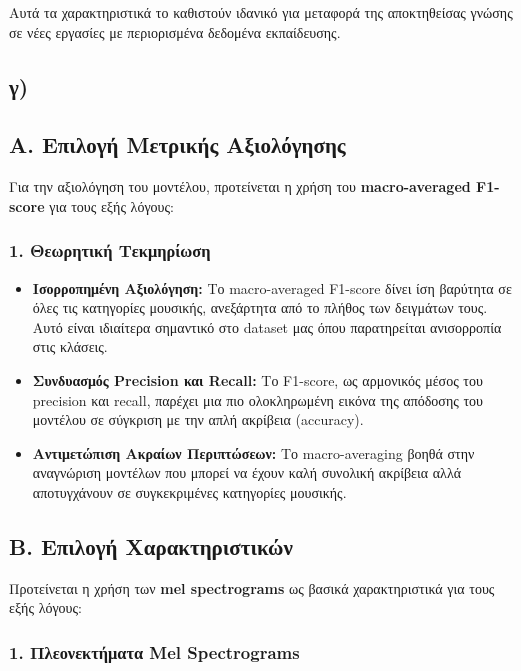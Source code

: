 \documentclass[a4paper,12pt]{article}
\begin{document}
Αυτά τα χαρακτηριστικά το καθιστούν ιδανικό για μεταφορά της αποκτηθείσας γνώσης σε νέες εργασίες με περιορισμένα δεδομένα εκπαίδευσης.


\subsection*{γ)}

\subsection*{Α. Επιλογή Μετρικής Αξιολόγησης}

Για την αξιολόγηση του μοντέλου, προτείνεται η χρήση του \textbf{macro-averaged F1-score} για τους εξής λόγους:

\subsubsection*{1. Θεωρητική Τεκμηρίωση}

\begin{itemize}
    \item \textbf{Ισορροπημένη Αξιολόγηση:} Το macro-averaged F1-score δίνει ίση βαρύτητα σε όλες τις κατηγορίες μουσικής, ανεξάρτητα από το πλήθος των δειγμάτων τους. Αυτό είναι ιδιαίτερα σημαντικό στο dataset μας όπου παρατηρείται ανισορροπία στις κλάσεις.

    \item \textbf{Συνδυασμός Precision και Recall:} Το F1-score, ως αρμονικός μέσος του precision και recall, παρέχει μια πιο ολοκληρωμένη εικόνα της απόδοσης του μοντέλου σε σύγκριση με την απλή ακρίβεια (accuracy).

    \item \textbf{Αντιμετώπιση Ακραίων Περιπτώσεων:} Το macro-averaging βοηθά στην αναγνώριση μοντέλων που μπορεί να έχουν καλή συνολική ακρίβεια αλλά αποτυγχάνουν σε συγκεκριμένες κατηγορίες μουσικής.
\end{itemize}

\subsection*{Β. Επιλογή Χαρακτηριστικών}

Προτείνεται η χρήση των \textbf{mel spectrograms} ως βασικά χαρακτηριστικά για τους εξής λόγους:

\subsubsection*{1. Πλεονεκτήματα Mel Spectrograms}
\end{document}
